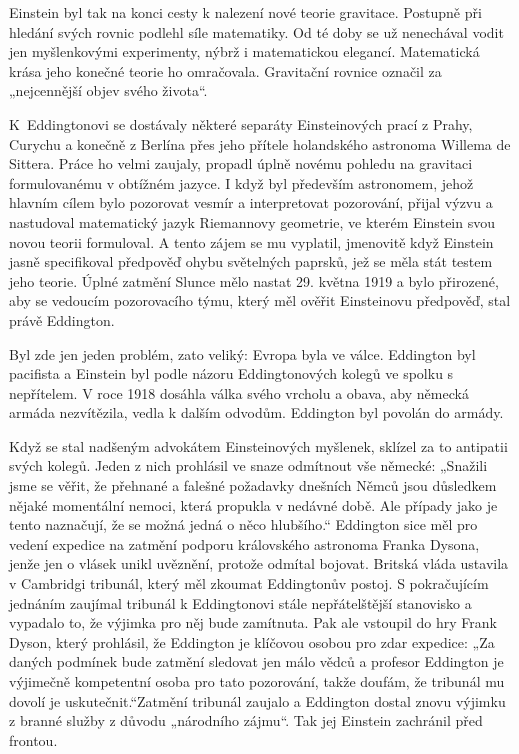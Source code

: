   Einstein byl tak na konci cesty k nalezení nové teorie gravitace. Postupně při hledání svých
  rovnic podlehl síle matematiky. Od té doby se už nenechával vodit jen myšlenkovými experimenty,
  nýbrž i matematickou elegancí. Matematická krása jeho konečné teorie ho omračovala. Gravitační
  rovnice označil za „nejcennější objev svého života“. 
  
  K Eddingtonovi se dostávaly některé separáty Einsteinových prací z Prahy, Curychu a konečně z
  Berlína přes jeho přítele holandského astronoma Willema de Sittera. Práce ho velmi zaujaly,
  propadl úplně novému pohledu na gravitaci formulovanému v obtížném jazyce. I když byl především
  astronomem, jehož hlavním cílem bylo pozorovat vesmír a interpretovat pozorování, přijal výzvu a
  nastudoval matematický jazyk Riemannovy geometrie, ve kterém Einstein svou novou teorii
  formuloval. A tento zájem se mu vyplatil, jmenovitě když Einstein jasně specifikoval předpověď
  ohybu světelných paprsků, jež se měla stát testem jeho teorie. Úplné zatmění Slunce mělo nastat
  29. května 1919 a bylo přirozené, aby se vedoucím pozorovacího týmu, který měl ověřit Einsteinovu
  předpověď, stal právě Eddington. 
  
  Byl zde jen jeden problém, zato veliký: Evropa byla ve válce. Eddington byl pacifista a Einstein
  byl podle názoru Eddingtonových kolegů ve spolku s nepřítelem. V roce 1918 dosáhla válka svého
  vrcholu a obava, aby německá armáda nezvítězila, vedla k dalším odvodům. Eddington byl povolán do
  armády. 
  
  Když se stal nadšeným advokátem Einsteinových myšlenek, sklízel za to antipatii svých kolegů.
  Jeden z nich prohlásil ve snaze odmítnout vše německé: „Snažili jsme se věřit, že přehnané a
  falešné požadavky dnešních Němců jsou důsledkem nějaké momentální nemoci, která propukla v nedávné
  době. Ale případy jako je tento naznačují, že se možná jedná o něco hlubšího.“ Eddington sice měl
  pro vedení expedice na zatmění podporu královského astronoma Franka Dysona, jenže jen o vlásek
  unikl uvěznění, protože odmítal bojovat. Britská vláda ustavila v Cambridgi tribunál, který měl
  zkoumat Eddingtonův postoj. S pokračujícím jednáním zaujímal tribunál k Eddingtonovi stále
  nepřátelštější stanovisko a vypadalo to, že výjimka pro něj bude zamítnuta. Pak ale vstoupil do
  hry Frank Dyson, který prohlásil, že Eddington je klíčovou osobou pro zdar expedice: „Za daných
  podmínek bude zatmění sledovat jen málo vědců a profesor Eddington je výjimečně kompetentní osoba
  pro tato pozorování, takže doufám, že tribunál mu dovolí je uskutečnit.“Zatmění tribunál zaujalo a
  Eddington dostal znovu výjimku z branné služby z důvodu „národního zájmu“. Tak jej Einstein
  zachránil před frontou. 
  
